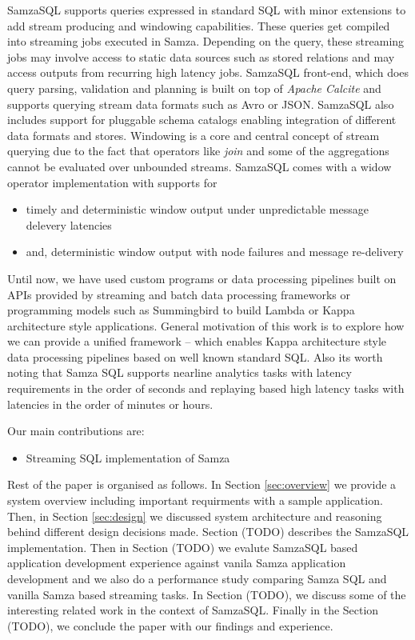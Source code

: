 \documentclass[10pt, conference, compsocconf]{IEEEtran}
\begin{document}
SamzaSQL supports queries expressed in standard SQL with minor extensions to add stream producing and windowing capabilities. These queries get compiled into streaming jobs executed in Samza. Depending on the query, these streaming jobs may involve access to static data sources such as stored relations and may access outputs from recurring high latency jobs. SamzaSQL front-end, which does query parsing, validation and planning is built on top of \textit{Apache Calcite} and supports querying stream data formats such as Avro or JSON. SamzaSQL also includes support for pluggable schema catalogs enabling integration of different data formats and stores. Windowing is a core and central concept of stream querying due to the fact that operators like \textit{join} and some of the aggregations cannot be evaluated over unbounded streams. SamzaSQL comes with a widow operator implementation with supports for 

\begin{itemize}
\item timely and deterministic window output under unpredictable message delevery latencies
\item and, deterministic window output with node failures and message re-delivery
\end{itemize}

Until now, we have used custom programs or data processing pipelines built on APIs provided by streaming and batch data processing frameworks or programming models such as Summingbird \cite{boykin2014summingbird} to build Lambda or Kappa architecture style applications. General motivation of this work is to explore how we can provide a unified framework -- which enables Kappa architecture style data processing pipelines based on well known standard SQL. Also its worth noting that Samza SQL supports nearline analytics tasks with latency requirements in the order of seconds and replaying based high latency tasks with latencies in the order of minutes or hours.

Our main contributions are:

\begin{itemize}
  \item Streaming SQL implementation of Samza
\end{itemize}


Rest of the paper is organised as follows. In Section \ref{sec:overview} we provide a system overview including important requirments with a sample application. Then, in Section \ref{sec:design} we discussed system architecture and reasoning behind different design decisions made. Section (TODO) describes the SamzaSQL implementation. Then in Section (TODO) we evalute SamzaSQL based application development experience against vanila Samza application development and we also do a performance study comparing Samza SQL and vanilla Samza based streaming tasks. In Section (TODO), we discuss some of the interesting related work in the context of SamzaSQL. Finally in the Section (TODO), we conclude the paper with our findings and experience.
\end{document}
